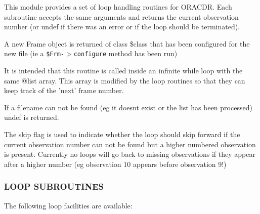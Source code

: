 This module provides a set of loop handling routines for ORACDR.
Each subroutine accepts the same arguments and returns the current
observation number (or undef if there was an error or if the loop
should be terminated).



A new  Frame object is returned of class \$class that has been configured
for the new file (ie a \texttt{\$Frm-$>$configure} method has been run)



It is intended that this routine is called inside an infinite while
loop with the same @list array. This array is modified by the loop
routines so that they can keep track of the 'next' frame number.



If a filename can not be found (eg it doesnt exist or the list has
been processed) undef is returned.



The skip flag is used to indicate whether the loop should skip
forward if the current observation number can not be found
but a higher numbered observation is present. Currently no loops
will go back to missing observations if they appear after a higher
number (eg observation 10 appears before observation 9!)

\subsubsection*{LOOP SUBROUTINES\label{ORAC::Loop_LOOP_SUBROUTINES}}


The following loop facilities are available:

